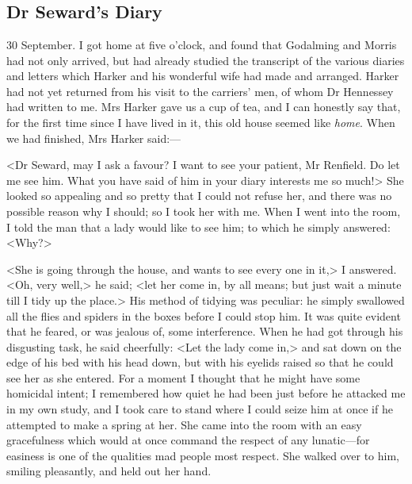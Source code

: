 \chapter[Chapter \thechapter]{}

\section{Dr Seward's Diary}
\begin{diary}{30 September.}
I got home at five o'clock, and found that Godalming and Morris had not only arrived, but had already studied the transcript of the various diaries and letters which Harker and his wonderful wife had made and arranged. Harker had not yet returned from his visit to the carriers' men, of whom Dr Hennessey had written to me. Mrs Harker gave us a cup of tea, and I can honestly say that, for the first time since I have lived in it, this old house seemed like \textit{home}. When we had finished, Mrs Harker said:—

<Dr Seward, may I ask a favour? I want to see your patient, Mr Renfield. Do let me see him. What you have said of him in your diary interests me so much!> She looked so appealing and so pretty that I could not refuse her, and there was no possible reason why I should; so I took her with me. When I went into the room, I told the man that a lady would like to see him; to which he simply answered: <Why?>

<She is going through the house, and wants to see every one in it,> I answered. <Oh, very well,> he said; <let her come in, by all means; but just wait a minute till I tidy up the place.> His method of tidying was peculiar: he simply swallowed all the flies and spiders in the boxes before I could stop him. It was quite evident that he feared, or was jealous of, some interference. When he had got through his disgusting task, he said cheerfully: <Let the lady come in,> and sat down on the edge of his bed with his head down, but with his eyelids raised so that he could see her as she entered. For a moment I thought that he might have some homicidal intent; I remembered how quiet he had been just before he attacked me in my own study, and I took care to stand where I could seize him at once if he attempted to make a spring at her. She came into the room with an easy gracefulness which would at once command the respect of any lunatic—for easiness is one of the qualities mad people most respect. She walked over to him, smiling pleasantly, and held out her hand.


\end{diary}
